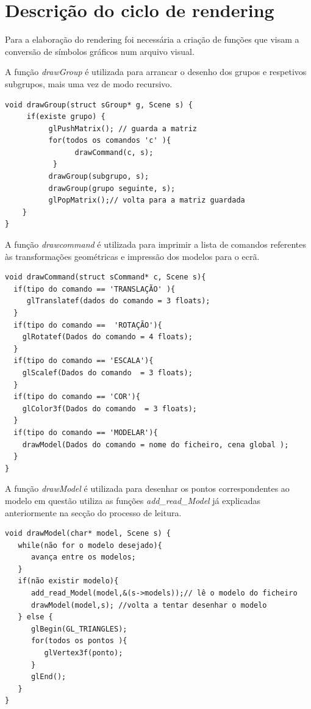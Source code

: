 \newpage
\section{ Descrição do ciclo de rendering}

Para a elaboração do rendering foi necessária a criação de funções que visam a conversão de símbolos gráficos num arquivo visual. 

A função \textit{drawGroup} é utilizada para arrancar o desenho dos grupos e respetivos subgrupos, mais uma vez de modo recursivo. 
\begin{Verbatim}
void drawGroup(struct sGroup* g, Scene s) {
     if(existe grupo) {
          glPushMatrix(); // guarda a matriz
          for(todos os comandos 'c' ){
                drawCommand(c, s);
           }
          drawGroup(subgrupo, s);
          drawGroup(grupo seguinte, s);
          glPopMatrix();// volta para a matriz guardada
    }
}
\end{Verbatim}


A função \textit{drawcommand} é utilizada para imprimir a lista de comandos referentes às transformações geométricas e impressão  dos modelos para o ecrã. 

\begin{Verbatim}
void drawCommand(struct sCommand* c, Scene s){
  if(tipo do comando == 'TRANSLAÇÃO' ){
     glTranslatef(dados do comando = 3 floats);
  }
  if(tipo do comando ==  'ROTAÇÃO'){
    glRotatef(Dados do comando = 4 floats);
  }
  if(tipo do comando == 'ESCALA'){
    glScalef(Dados do comando  = 3 floats);
  }
  if(tipo do comando == 'COR'){
    glColor3f(Dados do comando  = 3 floats);
  }
  if(tipo do comando == 'MODELAR'){
    drawModel(Dados do comando = nome do ficheiro, cena global );
  }
}

\end{Verbatim}


A função \textit{drawModel} é utilizada para desenhar os pontos correspondentes ao modelo em questão utiliza as funções \textit{add\_read\_Model} já explicadas anteriormente na secção do processo de leitura. 
\begin{Verbatim}
void drawModel(char* model, Scene s) {
   while(não for o modelo desejado){
      avança entre os modelos; 
   }
   if(não existir modelo){
      add_read_Model(model,&(s->models));// lê o modelo do ficheiro
      drawModel(model,s); //volta a tentar desenhar o modelo
   } else {
      glBegin(GL_TRIANGLES);
      for(todos os pontos ){
         glVertex3f(ponto);
      }
      glEnd();
   }
}
\end{Verbatim}


